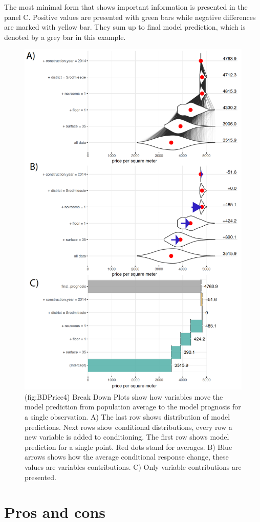 \documentclass[]{book}
\theoremstyle{definition}
\theoremstyle{definition}
\theoremstyle{definition}
\theoremstyle{remark}
\begin{document}
The most minimal form that shows important information is presented in
the panel C. Positive values are presented with green bars while
negative differences are marked with yellow bar. They sum up to final
model prediction, which is denoted by a grey bar in this example.

\begin{figure}

{\centering \includegraphics[width=0.7\linewidth]{figure/bd_price_4} 

}

\caption{(fig:BDPrice4) Break Down Plots show how variables move the model prediction from population average to the model prognosis for a single observation. A) The last row shows distribution of model predictions. Next rows show conditional distributions, every row a new variable is added to conditioning. The first row shows model prediction for a single point. Red dots stand for averages. B) Blue arrows shows how the average conditional response change, these values are variables contributions. C) Only variable contributions are presented. }\label{fig:BDPrice4}
\end{figure}

\hypertarget{pros-and-cons}{%
\section{Pros and cons}\label{pros-and-cons}}
\end{document}
